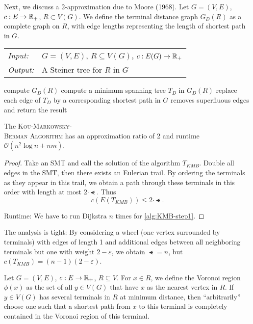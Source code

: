 \documentclass[../skript.tex]{subfiles}
\begin{document}
Next, we discuss a 2-approximation due to Moore (1968).
Let $G = (V, E)$, $c : E \to \mathbb{R}_+$, $R \subset V(G)$. We define the terminal distance graph $G_D(R)$ as a complete graph on $R$, with edge lengths representing the length of shortest path in $G$.
\begin{algorithmbox}
\begin{tabular}{@{}ll}
\textit{Input:} & $G = (V, E)$, $R \subseteq V(G)$, $c : E(G) \to \mathbb{R}_+$\\
\textit{Output:} & A Steiner tree for $R$ in $G$
\end{tabular}
\end{algorithmbox}
\vspace{-7pt}
\begin{algorithm}[H]
compute $G_D(R)$\label{alg:KMB-step1}\;
compute a minimum spanning tree $T_D$ in $G_D(R)$\;
replace each edge of $T_D$ by a corresponding shortest path in $G$\;
removes superfluous edges and return the result\;
\end{algorithm}
\vspace{-7pt}
\EndAlgorithmLine
\begin{theorem} %
\label{thm:69}
The \textsc{Kou-Markowsky-\\Berman Algorithm} has an approximation ratio of 2 and runtime $\mathcal{O}(n^2 \log n + nm)$.
\end{theorem}
\begin{proof}
Take an \ac{SMT} and call the solution of the algorithm $T_{KMB}$.
Double all edges in the \ac{SMT}, then there exists an Eulerian trail. By ordering the terminals as they appear in this trail, we obtain a path through these terminals in this order with length at most $2 \cdot \smt$. Thus
\[
c(E(T_{KMB})) \leq 2 \cdot \smt.
\]

Runtime: We have to run Dijkstra $n$ times for \cref{alg:KMB-step1}.
\end{proof}
\begin{remark}
The analysis is tight: By considering a wheel (one vertex surrounded by terminals) with edges of length 1 and additional edges between all neighboring terminals but one with weight $2 - \varepsilon$, we obtain $\smt = n$, but $c(T_{KMB}) = (n-1)(2-\varepsilon)$. 
\end{remark}
Let $G = (V, E)$, $c : E \to \mathbb{R}_+$, $R \subseteq V$.
For $x \in R$, we define the Voronoi region $\phi(x)$ as the set of all $y \in V(G)$ that have $x$ as the nearest vertex in $R$.
If $y \in V(G)$ has several terminals in $R$ at minimum distance, then ``arbitrarily'' choose one such that a shortest path from $x$ to this terminal is completely contained in the Voronoi region of this terminal.
\end{document}
